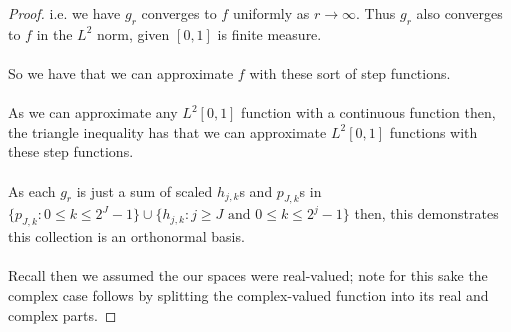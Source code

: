 \documentclass[12pt]{article}
\newenvironment{ex}[2][Exercise]{\begin{trivlist}
\item[\hskip \labelsep {\bfseries #1}\hskip \labelsep {\bfseries #2.}]}{\end{trivlist}}
\begin{document}
\begin{ex}{14}
\begin{enumerate}
\begin{proof}
            i.e. we have $g_r$ converges to $f$ uniformly as $r \rightarrow \infty$. Thus $g_r$ also converges to $f$ in the $L^2$ norm, given $[0,1]$ is finite measure. \\ \\
            So we have that we can approximate $f$ with these sort of step functions. \\ \\As we can approximate any $L^2[0,1]$ function with a continuous function then, the triangle inequality has that we can approximate $L^2[0,1]$ functions with these step functions. \\ \\
            As each $g_r$ is just a sum of scaled $h_{j,k}$s and $p_{J,k}$s in $\{p_{J,k} : 0 \leq k \leq 2^J - 1\} \cup \{h_{j, k} : j \geq J \text{ and } 0 \leq k \leq 2^j - 1\}$ then, this demonstrates this collection is an orthonormal basis. \\ \\
            Recall then we assumed the our spaces were real-valued; note for this sake the complex case follows by splitting the complex-valued function into its real and complex parts.

        \end{proof}
    \end{enumerate}
\end{ex}
\end{document}
